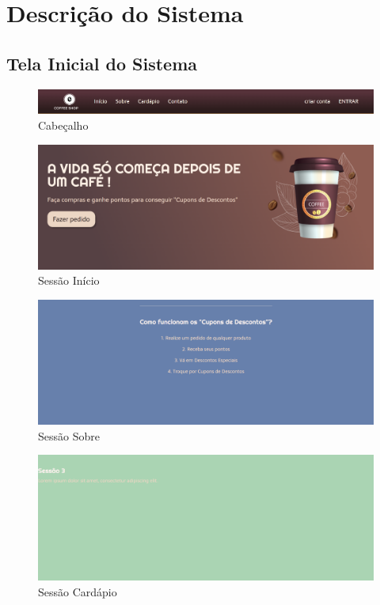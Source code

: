
\chapter{Descrição do Sistema}
\section{Tela Inicial do Sistema}
\begin{figure}[!h]
	\centering
	\includegraphics[width=15cm]{Cabeçalho}
	\caption{Cabeçalho}
\end{figure}

\begin{figure}[!h]
	\centering
	\includegraphics[width=15cm]{Sessão Início}
	\caption{Sessão Início}
\end{figure}

\begin{figure}[!h]
	\centering
	\includegraphics[width=15cm]{Sessão Sobre}
	\caption{Sessão Sobre}
\end{figure}

\begin{figure}[!h]
	\centering
	\includegraphics[width=15cm]{Sessão Cardápio}
	\caption{Sessão Cardápio}
\end{figure}

